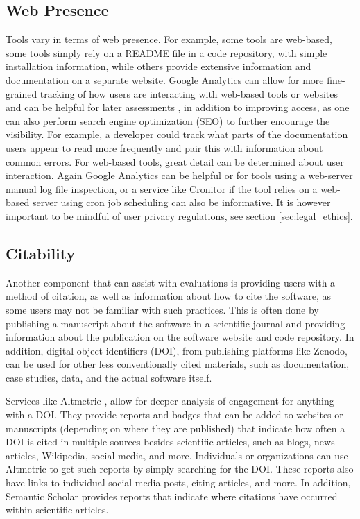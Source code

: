 \documentclass{article}
\begin{document}
\subsection{Web Presence}
Tools vary in terms of web presence. For example, some tools are web-based, some tools simply rely on a README file in a code repository, with simple installation information, while others provide extensive information and documentation on a separate website. Google Analytics can allow for more fine-grained tracking of how users are interacting with web-based tools or websites and can be helpful for later assessments , in addition to improving access, as one can also perform search engine optimization (SEO) to further encourage the visibility. For example, a developer could track what parts of the documentation users appear to read more frequently and pair this with information about common errors. For web-based tools, great detail can be determined about user interaction. Again Google Analytics can be helpful or for tools using a web-server manual log file inspection, or a service like Cronitor \cite{cronitor}  if the tool relies on a web-based server using cron \cite{cron_2009} job scheduling can also be informative.  It is however important to be mindful of user privacy regulations, see section \ref{sec:legal_ethics}.

\subsection{Citability}
Another component that can assist with evaluations is providing users with a method of citation, as well as information about how to cite the software, as some users may not be familiar with such practices. This is often done by publishing a manuscript about the software in a scientific journal and providing information about the publication on the software website and code repository. In addition, digital object identifiers (DOI), from publishing platforms like Zenodo, can be used for other less conventionally cited materials, such as documentation, case studies, data, and the actual software itself.

Services like Altmetric \cite{noauthor_altmetric_2015}, allow for deeper analysis of engagement for anything with a DOI. They provide reports and badges that can be added to websites or manuscripts (depending on where they are published) that indicate how often a DOI is cited in multiple sources besides scientific articles, such as blogs, news articles, Wikipedia, social media, and more.  Individuals or organizations can use Altmetric to get such reports by simply searching for the DOI. These reports also have links to individual social media posts, citing articles, and more. In addition, Semantic Scholar \cite{noauthor_semantic_nodate} provides reports that indicate where citations have occurred within scientific articles. 
\end{document}
